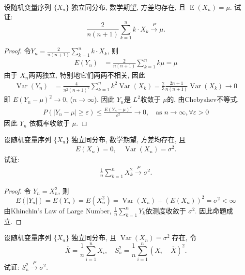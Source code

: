 \documentclass[../main.tex]{subfiles}
\begin{document}
\begin{exercise}{}{}
设随机变量序列 $\{X_n\}$ 独立同分布, 数学期望, 方差均存在, 且 $\operatorname{E}(X_n) = \mu$. 试证:
$$\frac{2}{n(n+1)} \sum_{k=1}^{n} k \cdot X_k \xrightarrow{P} \mu.$$
\end{exercise}
\begin{proof}
 令$Y_{n}= \frac{2 }{n\left(n+ 1\right) }\sum _{k= 1}^{n}k\cdot X_{k}$, 则 
 $$ \begin{aligned} E\left(Y_{n}\right)&= \frac{2 }{n\left(n+ 1\right) }\sum _{k= 1}^{n}k\mu = \mu   \end{aligned} $$ 
由于 $X_{n}$两两独立, 特别地它们两两不相关, 因此 
 $$ \begin{aligned} \operatorname{Var}\left(Y_{n}\right)&= \frac{4 }{n^{2}\left(n+ 1\right)^{2} }\sum _{k= 1}^{n}k^{2}\operatorname{Var}\left(X_{k}\right)= \frac{2 }{3 }\frac{2n+ 1 }{n\left(n+ 1\right) }\operatorname{Var}\left(X_{k}\right)\to 0 \end{aligned} $$
即 $E\left(Y_{n}-\mu \right)^{2}\to 0$, ($n\to \infty$). 因此 $Y_{n}$是 $L^{2}$收敛于 $\mu$的, 由Chebyshev不等式,  
 $$ \begin{aligned} P\left(\left| Y_{n}-\mu  \right|\ge  \varepsilon  \right)\le \frac{E\left(Y_{n}-\mu \right)^{2} }{ \varepsilon  ^{2}}\to 0 ,\quad \text{as }n\to \infty, \forall  \varepsilon > 0 \end{aligned} $$
因此 $Y_{n}$ 依概率收敛于 $\mu$.
\end{proof}
\begin{exercise}{}{}
设随机变量序列 $\{X_n\}$ 独立同分布, 数学期望, 方差均存在, 且
$$
\begin{aligned}
E(X_n) = 0, \quad \operatorname{Var}(X_n) = \sigma^2.
\end{aligned}
$$
试证:
$$
\begin{aligned}
\frac{1}{n} \sum_{k=1}^n X_k^2 \xrightarrow{P} \sigma^2.
\end{aligned}
$$
\end{exercise}
\begin{proof}
令 $Y_{n}= X_{n}^{2}$, 则
 $$ E\left(\left| Y_{n} \right| \right) = E\left(Y_{n}\right)= E\left(X_{n}^{2}\right)= \operatorname{Var}\left(X_{n}\right)+ \left(E\left(X_{n}\right)\right)^{2}= \sigma ^{2} < \infty$$ 
由Khinchin's Law of Large Number, $\frac{1 }{n }\sum _{k= 1}^{n}Y_{k}$依测度收敛于 $\sigma ^{2}$. 因此命题成立.
\end{proof}
\begin{exercise}{}{}
设随机变量序列 $\{X_n\}$ 独立同分布, 且 $\operatorname{Var}(X_n) = \sigma^2$ 存在, 令
$$ \overline{X} = \frac{1}{n} \sum_{i=1}^n X_i, \quad S_n^2 = \frac{1}{n} \sum_{i=1}^n (X_i - \overline{X})^2. $$
试证: $S_n^2 \xrightarrow{P} \sigma^2$.
\end{exercise}
\end{document}
